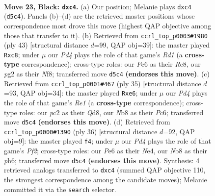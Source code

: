 \documentclass[11pt]{article}
\begin{document}
\clearpage

\begin{figure}[p]\centering
\begin{subfigure}{0.46\textwidth}\centering
\resizebox{\linewidth}{!}{%
\newchessgame
\chessboard[
  setfen={rn2r1k1/2pnq1pp/1p2p3/p2pPp2/2BP1P1P/P4NNQ/1PPK2P1/1R5R b - - 0 23},
  showmover=false,
  pgfstyle=straightmove, color=movearrow, markmove={d5-c4}
]}
\caption{}
\end{subfigure}\hfill
\begin{subfigure}{0.46\textwidth}\centering
\resizebox{\linewidth}{!}{%
\newchessgame
\chessboard[
  setfen={2Brrnk1/2q2pp1/1p1p1n2/p2Pp3/2P1P2p/R2QNPP1/1P1N3P/R5K1 b - - 0 22},
  showmover=false,
  pgfstyle=straightmove, color=movearrow, markmove={d8-c8}
]}
\caption{}
\end{subfigure}
\\[4pt]
\begin{subfigure}{0.46\textwidth}\centering
\resizebox{\linewidth}{!}{%
\newchessgame
\chessboard[
  setfen={1r1qr3/1p3ppk/p1ppBnnp/P3p3/4P3/1P1PPN1P/1NP3P1/R3QRK1 b - - 0 18},
  showmover=false,
  pgfstyle=straightmove, color=movearrow, markmove={e8-e6}
]}
\caption{}
\end{subfigure}\hfill
\begin{subfigure}{0.46\textwidth}\centering
\resizebox{\linewidth}{!}{%
\newchessgame
\chessboard[
  setfen={r4rk1/pn1qn3/1p1p2pp/1Pp1p3/2P1N2P/P2P2P1/1Q2NP2/R3K2R w KQ - 0 19},
  showmover=false,
  pgfstyle=straightmove, color=movearrow, markmove={f2-f4}
]}
\caption{}
\end{subfigure}
\caption{\textbf{Move 23, Black: \texttt{dxc4}.} (a) Our position; Melanie plays \texttt{dxc4} (\texttt{d5c4}). Panels (b)--(d) are the retrieved master positions whose correspondence most drove this move (highest QAP objective among those that transfer to it). (b) Retrieved from \texttt{ccrl\_top\_p0003\#1980} (ply 43) [structural distance $d$=99, QAP obj=39]: the master played \texttt{Rxc8}; under $\mu$ our \emph{Pd4} plays the role of that game's \emph{Rd1} (a \textbf{cross-type} correspondence); cross-type roles: our \emph{P}e6 as their \emph{R}e8, our \emph{p}g2 as their \emph{N}f8; transferred move \texttt{d5c4} \textbf{(endorses this move)}. (c) Retrieved from \texttt{ccrl\_top\_p0001\#467} (ply 35) [structural distance $d$=93, QAP obj=34]: the master played \texttt{Rxe6}; under $\mu$ our \emph{Pd4} plays the role of that game's \emph{Re1} (a \textbf{cross-type} correspondence); cross-type roles: our \emph{p}c2 as their \emph{Q}d8, our \emph{N}b8 as their \emph{P}c6; transferred move \texttt{d5c4} \textbf{(endorses this move)}. (d) Retrieved from \texttt{ccrl\_top\_p0000\#1390} (ply 36) [structural distance $d$=92, QAP obj=9]: the master played \texttt{f4}; under $\mu$ our \emph{Pd4} plays the role of that game's \emph{Pf2}; cross-type roles: our \emph{P}e6 as their \emph{N}e4, our \emph{N}b8 as their \emph{p}h6; transferred move \texttt{d5c4} \textbf{(endorses this move)}. Synthesis: 4 retrieved analogs transferred to \texttt{dxc4} (summed QAP objective 110, the strongest correspondence among the candidate moves); Melanie committed it via the \texttt{search} selector.}
\label{fig:thought-m45}
\end{figure}
\end{document}
